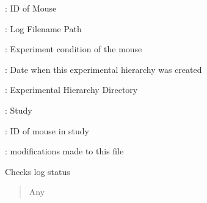 \documentclass[letterpaper,10pt,english]{sphinxmanual}
\begin{document}
\begin{fulllineitems}
\begin{description}
\begin{DUlineblock}{0em}
\item[]  : ID of Mouse
\item[]  : Log Filename Path
\item[]  : Experiment condition of the mouse
\item[]  : Date when this experimental hierarchy was created
\end{DUlineblock}

\begin{DUlineblock}{0em}
\item[]  : Experimental Hierarchy Directory
\item[]  : Study
\item[]  : ID of mouse in study
\item[]  : modifications made to this file
\end{DUlineblock}

\end{description}

\begin{fulllineitems}
\label{\detokenize{ExperimentHierarchy:ExperimentHierarchy.ExperimentData.check_log}}
\pysigstartsignatures
{}
\pysigstopsignatures
\sphinxAtStartPar
Checks log status
\begin{quote}\begin{description}
\sphinxAtStartPar
Any

\end{description}\end{quote}

\end{fulllineitems}


\begin{fulllineitems}
\label{\detokenize{ExperimentHierarchy:ExperimentHierarchy.ExperimentData.check_path}}
\pysigstartsignatures
{}
\pysigstopsignatures
\end{fulllineitems}


\end{fulllineitems}
\end{document}
